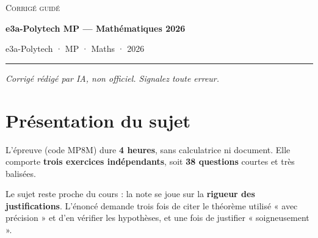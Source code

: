 \documentclass[11pt,a4paper]{article}
\begin{document}
\thispagestyle{plain}
\begin{center}
  {\small\scshape Corrigé guidé}\par\smallskip
  {\LARGE\bfseries e3a-Polytech MP — Mathématiques 2026\par}\medskip
  {\large e3a-Polytech · MP · Maths · 2026\par}
\end{center}
\vspace{2pt}\hrule\vspace{8pt}

\emph{Corrigé rédigé par IA, non officiel. Signalez toute erreur.}

\hypertarget{pruxe9sentation-du-sujet}{%
\section{Présentation du sujet}\label{pruxe9sentation-du-sujet}}

L'épreuve (code MP8M) dure \textbf{4 heures}, sans calculatrice ni document. Elle comporte \textbf{trois exercices indépendants}, soit \textbf{38 questions} courtes et très balisées.

Le sujet reste proche du cours : la note se joue sur la \textbf{rigueur des justifications}. L'énoncé demande trois fois de citer le théorème utilisé « avec précision » et d'en vérifier les hypothèses, et une fois de justifier « soigneusement ».
\end{document}

